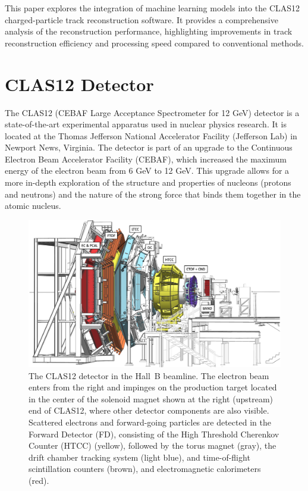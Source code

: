 \documentclass[preprint,12pt]{elsarticle}
\begin{document}
This paper explores the integration of machine learning models into the CLAS12 charged-particle track reconstruction software. It provides a comprehensive analysis of the reconstruction performance, highlighting improvements in track reconstruction efficiency and processing speed compared to conventional methods.


\section{CLAS12 Detector}

The CLAS12 (CEBAF Large Acceptance Spectrometer for 12 GeV) detector is a state-of-the-art experimental apparatus used in nuclear physics research. It is located at the Thomas Jefferson National Accelerator Facility (Jefferson Lab) in Newport News, Virginia. The detector is part of an upgrade to the Continuous Electron Beam Accelerator Facility (CEBAF), which increased the maximum energy of the electron beam from 6 GeV to 12 GeV. This upgrade allows for a more in-depth exploration of the structure and properties of nucleons (protons and neutrons) and the nature of the strong force that binds them together in the atomic nucleus.

\begin{figure}[h!]
\centering
\centerline{\includegraphics[width=0.7\columnwidth]{images/CLAS12-side.png}}
\caption{The CLAS12 detector in the Hall~B beamline. The electron beam enters from the right and impinges on
  the production target located in the center of the solenoid magnet shown at the right (upstream) end of CLAS12,
  where other detector components are also visible. Scattered electrons and forward-going particles are detected
  in the Forward Detector (FD), consisting of the High Threshold Cherenkov Counter (HTCC) (yellow), 
  followed by the torus magnet (gray), the drift chamber tracking system (light blue),
  and time-of-flight scintillation counters (brown), and electromagnetic calorimeters (red). } 
\label{fig:CLAS12}
\end{figure}
\end{document}
